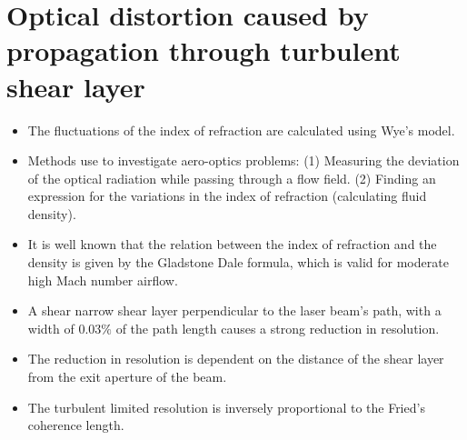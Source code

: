     \section{Optical distortion caused by propagation through turbulent shear layer \cite{10.1117/12.510945}} 
        \begin{itemize} 
            \item The fluctuations of the index of refraction are calculated using Wye's model.
            \item Methods use to investigate aero-optics problems: (1) Measuring the deviation of the optical radiation while passing through a flow field. (2) Finding an expression for the variations in the index of refraction (calculating fluid density). 
            \item It is well known that the relation between the index of refraction and the density is given by the Gladstone Dale formula, which is valid for moderate high Mach number airflow.   
            \item A shear narrow shear layer perpendicular to the laser beam's path, with a width of $0.03\%$ of the path length causes a strong reduction in resolution.
            \item The reduction in resolution is dependent on the distance of the shear layer from the exit aperture of the beam. 
            \item The turbulent limited resolution is inversely proportional to the Fried's coherence length.
        \end{itemize}


